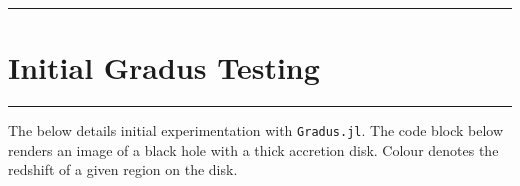 \documentclass[
  letterpaper,
  DIV=11,
  numbers=noendperiod]{scrreprt}
\begin{document}
\begin{center}\rule{0.5\linewidth}{0.5pt}\end{center}


\chapter{Initial Gradus Testing}\label{initial-gradus-testing}

\begin{center}\rule{0.5\linewidth}{0.5pt}\end{center}

The below details initial experimentation with \texttt{Gradus.jl}. The
code block below renders an image of a black hole with a thick accretion
disk. Colour denotes the redshift of a given region on the disk.
\end{document}
